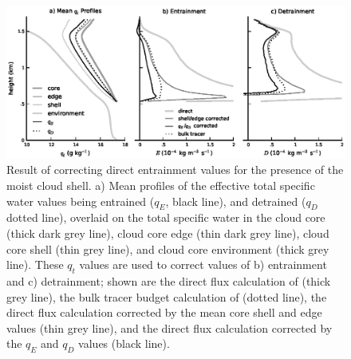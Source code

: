\documentclass[draft,grl]{agutex}
\begin{document}
\begin{article}







%
%

\end{article}




\begin{figure}
  \noindent\includegraphics[width=39pc]{./figures/reynolds_correction}
  \caption{Result of correcting direct entrainment values for the presence of 
  the moist cloud shell.  a) Mean profiles of the effective total specific 
  water values being entrained ($q_E$, black line), and detrained ($q_D$ dotted 
  line), overlaid on the total specific water in the cloud core (thick dark 
  grey line), cloud core edge (thin dark grey line), cloud core shell (thin 
  grey line), and cloud core environment (thick grey line).  These $q_t$ values 
  are used to correct values of b) entrainment and c) detrainment; shown are the 
  direct flux calculation of \cite{Romps2010} (thick grey line), the bulk 
  tracer budget calculation of \cite{Siebesma1995} (dotted line), the direct 
  flux calculation corrected by the mean core shell and edge values (thin grey 
  line), and the direct flux calculation corrected by the $q_E$ and $q_D$ 
  values (black line).}
  \label{fig:Reynolds_correction}
\end{figure}
\end{document}
